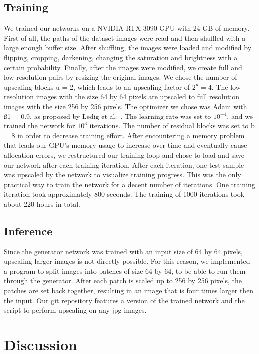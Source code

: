 \documentclass[11pt,twocolumn,twoside,paper=a4]{IEEEtran}
\begin{document}
\subsection{Training}
We trained our networks on a NVIDIA RTX 3090 GPU with 24 GB of memory. 
First of all, the paths of the dataset images were read and then shuffled with a large enough buffer size. 
After shuffling, the images were loaded and modified by flipping, cropping, darkening, changing the saturation and brightness with a certain probability. 
Finally, after the images were modified, we create full and low-resolution pairs by resizing the original images. 
We chose the number of upscaling blocks u = 2, which leads to an upscaling factor of $2^{u} = 4$.  
The low-resolution images with the size 64 by 64 pixels are upscaled to full resolution images with the size 256 by 256 pixels.
The optimizer we chose was Adam with ß1 = 0.9, as proposed by Ledig et al.~\cite{DBLP:journals/corr/LedigTHCATTWS16}. 
The learning rate was set to $10^{-4}$, and we trained the network for $10^3$ iterations.
The number of residual blocks was set to b = 8 in order to decrease training effort. 
After encountering a memory problem that leads our GPU's memory usage to increase over time and eventually cause allocation errors, we restructured our training loop and chose to load and save our network after each training iteration. 
After each iteration, one test sample was upscaled by the network to visualize training progress.
This was the only practical way to train the network for a decent number of iterations. 
One training iteration took approximately 800 seconds. The training of 1000 iterations took about 220 hours in total.


\subsection{Inference}
Since the generator network was trained with an input size of 64 by 64 pixels, upscaling larger images is not directly possible.
For this reason, we implemented a program to split images into patches of size 64 by 64, to be able to run them through the generator.
After each patch is scaled up to 256 by 256 pixels, the patches are set back together, resulting in an image that is four times larger then the input. 
Our git repository features a version of the trained network and the script to perform upscaling on any jpg images.

\section*{Discussion}
\end{document}
